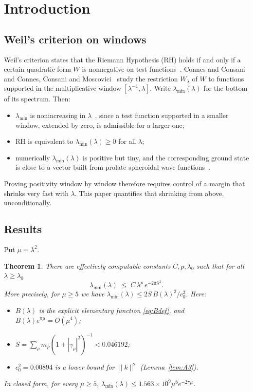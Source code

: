 \documentclass[11pt]{amsart}
\newtheorem{theorem}{Theorem}
\theoremstyle{definition}
\theoremstyle{remark}
\numberwithin{equation}{section}
\begin{document}
\section{Introduction}

\subsection{Weil's criterion on windows}
Weil's criterion states that the Riemann Hypothesis (RH) holds if and only if a certain quadratic form $W$ is nonnegative on test functions~\cite{Weil52,Bombieri00}. Connes and Consani~\cite{CC21} and Connes, Consani and Moscovici~\cite{CCM25} study the restriction $W_\lambda$ of $W$ to functions supported in the multiplicative window $[\lambda^{-1},\lambda]$. Write $\lambda_{\min}(\lambda)$ for the bottom of its spectrum. Then:
\begin{itemize}
\item $\lambda_{\min}$ is nonincreasing in $\lambda$~\cite[(3.27)]{CCM25}, since a test function supported in a smaller window, extended by zero, is admissible for a larger one;
\item RH is equivalent to $\lambda_{\min}(\lambda)\ge0$ for all $\lambda$;
\item numerically $\lambda_{\min}(\lambda)$ is positive but tiny, and the corresponding ground state is close to a vector built from prolate spheroidal wave functions~\cite{CC21,CCM25}.
\end{itemize}
Proving positivity window by window therefore requires control of a margin that shrinks very fast with $\lambda$. This paper quantifies that shrinking from above, unconditionally.

\subsection{Results}
Put $\mu=\lambda^2$.

\begin{theorem}\label{thm:A}
There are effectively computable constants $C,p,\lambda_0$ such that for all $\lambda\ge\lambda_0$
\[
\lambda_{\min}(\lambda)\;\le\;C\,\lambda^{p}\,e^{-2\pi\lambda^{2}} .
\]
More precisely, for $\mu\ge5$ we have $\lambda_{\min}(\lambda)\le 2S\,B(\lambda)^2/c_0^2$. Here:
\begin{itemize}
\item $B(\lambda)$ is the explicit elementary function \eqref{eq:Bdef}, and $B(\lambda)e^{\pi\mu}=O(\mu^{4})$;
\item $S=\sum_\rho m_\rho(1+|\gamma_\rho|^2)^{-1}<0.046192$;
\item $c_0^2=0.00894$ is a lower bound for $\|k\|^2$ (Lemma~\ref{lem:A3}).
\end{itemize}
In closed form, for every $\mu\ge5$, $\lambda_{\min}(\lambda)\le1.563\times10^{9}\mu^{8}e^{-2\pi\mu}$.
\end{theorem}
\end{document}
